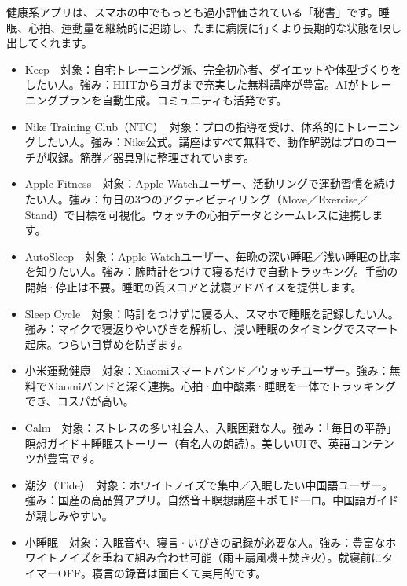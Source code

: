 健康系アプリは、スマホの中でもっとも過小評価されている「秘書」です。睡眠、心拍、運動量を継続的に追跡し、たまに病院に行くより長期的な状態を映し出してくれます。


\begin{itemize}
  \item Keep　対象：自宅トレーニング派、完全初心者、ダイエットや体型づくりをしたい人。強み：HIITからヨガまで充実した無料講座が豊富。AIがトレーニングプランを自動生成。コミュニティも活発です。
  \item Nike Training Club（NTC）　対象：プロの指導を受け、体系的にトレーニングしたい人。強み：Nike公式。講座はすべて無料で、動作解説はプロのコーチが収録。筋群／器具別に整理されています。
  \item Apple Fitness　対象：Apple Watchユーザー、活動リングで運動習慣を続けたい人。強み：毎日の3つのアクティビティリング（Move／Exercise／Stand）で目標を可視化。ウォッチの心拍データとシームレスに連携します。
\end{itemize}


\begin{itemize}
  \item AutoSleep　対象：Apple Watchユーザー、毎晩の深い睡眠／浅い睡眠の比率を知りたい人。強み：腕時計をつけて寝るだけで自動トラッキング。手動の開始·停止は不要。睡眠の質スコアと就寝アドバイスを提供します。
  \item Sleep Cycle　対象：時計をつけずに寝る人、スマホで睡眠を記録したい人。強み：マイクで寝返りやいびきを解析し、浅い睡眠のタイミングでスマート起床。つらい目覚めを防ぎます。
  \item 小米運動健康　対象：Xiaomiスマートバンド／ウォッチユーザー。強み：無料でXiaomiバンドと深く連携。心拍·血中酸素·睡眠を一体でトラッキングでき、コスパが高い。
\end{itemize}


\begin{itemize}
  \item Calm　対象：ストレスの多い社会人、入眠困難な人。強み：「毎日の平静」瞑想ガイド＋睡眠ストーリー（有名人の朗読）。美しいUIで、英語コンテンツが豊富です。
  \item 潮汐（Tide）　対象：ホワイトノイズで集中／入眠したい中国語ユーザー。強み：国産の高品質アプリ。自然音＋瞑想講座＋ポモドーロ。中国語ガイドが親しみやすい。
  \item 小睡眠　対象：入眠音や、寝言·いびきの記録が必要な人。強み：豊富なホワイトノイズを重ねて組み合わせ可能（雨＋扇風機＋焚き火）。就寝前にタイマーOFF。寝言の録音は面白くて実用的です。
\end{itemize}

